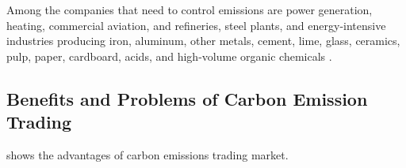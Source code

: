 Among the companies that need to control emissions are power generation, heating, commercial aviation, and refineries, steel plants, and energy-intensive industries producing iron, aluminum, other metals, cement, lime, glass, ceramics, pulp, paper, cardboard, acids, and high-volume organic chemicals \cite{YUYIN2018675}.

\subsection{Benefits and Problems of Carbon Emission Trading}

 shows the advantages of carbon emissions trading market\cite{JIA2020120187}.
\begin{table}[!htb]
    \centering
    \caption{Advantages and disadvantages of carbon emission market}
    \label{Table:advofcarbonemision}
\end{table}


